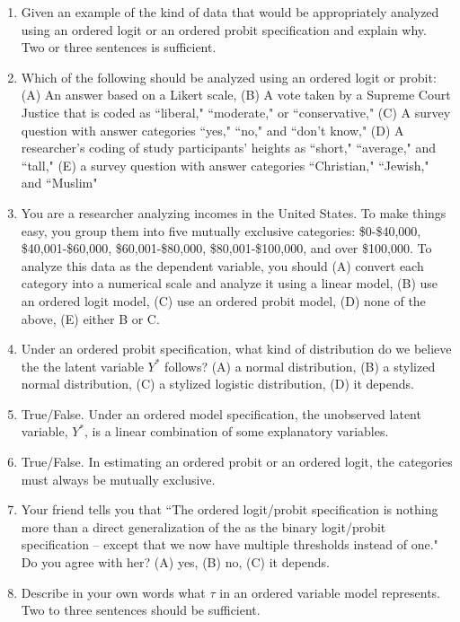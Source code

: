 \documentclass[11pt]{article}
\begin{document}
\begin{enumerate}
\item Given an example of the kind of data that would be appropriately analyzed using an ordered logit or an ordered probit specification and explain why.  Two or three sentences is sufficient. 
\item Which of the following should be analyzed using an ordered logit or probit: (A) An answer based on a Likert scale, (B) A vote taken by a Supreme Court Justice that is coded as ``liberal," ``moderate," or ``conservative," (C) A survey question with answer categories ``yes," ``no," and ``don't know," (D) A researcher's coding of study participants' heights as ``short," ``average," and ``tall," (E) a survey question with answer categories ``Christian," ``Jewish," and ``Muslim" 
\item You are a researcher analyzing incomes in the United States. To make things easy, you group them into five mutually exclusive categories: \$0-\$40,000, \$40,001-\$60,000, \$60,001-\$80,000, \$80,001-\$100,000, and over \$100,000. To analyze this data as the dependent variable, you should (A) convert each category into a numerical scale and analyze it using a linear model, (B) use an ordered logit model, (C) use an ordered probit model, (D) none of the above, (E) either B or C. 
\item Under an ordered probit specification, what kind of distribution do we believe the the latent variable $Y^*$ follows? (A) a normal distribution, (B) a stylized normal distribution, (C) a stylized logistic distribution, (D) it depends. 
\item True/False. Under an ordered model specification, the unobserved latent variable, $Y^*$, is a linear combination of some explanatory variables. 
\item True/False. In estimating an ordered probit or an ordered logit, the categories must always be mutually exclusive.
\item Your friend tells you that ``The ordered logit/probit specification is nothing more than a direct generalization of the as the binary logit/probit specification -- except that we now have multiple thresholds instead of one." Do you agree with her? (A) yes, (B) no, (C) it depends. 
\item Describe in your own words what $\tau$ in an ordered variable model represents.  Two to three sentences should be sufficient. 

\end{enumerate}
\end{document}
